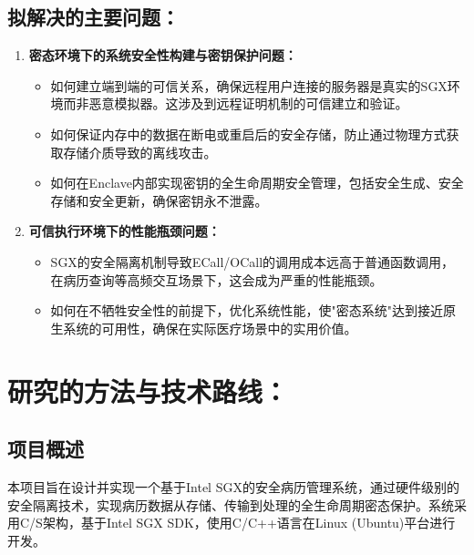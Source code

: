 \documentclass{article}
\begin{document}
\subsection*{拟解决的主要问题：}
\begin{enumerate}[leftmargin=*, label=\arabic*、]
  \item \textbf{密态环境下的系统安全性构建与密钥保护问题：}
    \begin{itemize}[leftmargin=2em]
      \item 如何建立端到端的可信关系，确保远程用户连接的服务器是真实的SGX环境而非恶意模拟器。这涉及到远程证明机制的可信建立和验证。
      \item 如何保证内存中的数据在断电或重启后的安全存储，防止通过物理方式获取存储介质导致的离线攻击。
      \item 如何在Enclave内部实现密钥的全生命周期安全管理，包括安全生成、安全存储和安全更新，确保密钥永不泄露。
    \end{itemize}
  
  \item \textbf{可信执行环境下的性能瓶颈问题：}
    \begin{itemize}[leftmargin=2em]
      \item SGX的安全隔离机制导致ECall/OCall的调用成本远高于普通函数调用，在病历查询等高频交互场景下，这会成为严重的性能瓶颈。
      \item 如何在不牺牲安全性的前提下，优化系统性能，使"密态系统"达到接近原生系统的可用性，确保在实际医疗场景中的实用价值。
    \end{itemize}
\end{enumerate}

\vspace{0.8cm}
\fullwidthrule

\section{研究的方法与技术路线：}

\subsection*{项目概述}
\noindent 本项目旨在设计并实现一个基于Intel SGX的安全病历管理系统，通过硬件级别的安全隔离技术，实现病历数据从存储、传输到处理的全生命周期密态保护。系统采用C/S架构，基于Intel SGX SDK，使用C/C++语言在Linux (Ubuntu)平台进行开发。
\end{document}
